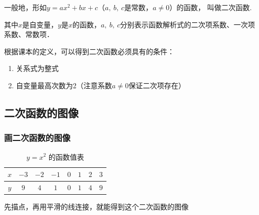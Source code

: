 \documentclass[lang=cn, 10pt, titlestyle=display, oneside, toc=twocol]{elegantbook}
\begin{document}
\begin{definition}
一般地，形如\(y=ax^2+bx+c\)（\(a,\ b,\ c\)是常数，\(a\ne0\)）的函数， 叫做二次函数.
\par
其中\(x\)是自变量，\(y\)是\(x\)的函数，\(a,\ b,\ c\)分别表示函数解析式的二次项系数、一次项系数、常数项．
\end{definition}

根据课本的定义，可以得到二次函数必须具有的条件：
\begin{enumerate}
    \item 关系式为整式
    \item 自变量最高次数为2（注意系数\(a\ne0\)保证二次项存在）
\end{enumerate}

\subsection{二次函数的图像}

\subsubsection{画二次函数的图像}
\begin{table}[h]
\centering
\renewcommand{\arraystretch}{1.2} %
\begin{tabular}{|c|*{7}{c|}} \hline
\( x \) & \(-3\) & \(-2\) & \(-1\) & \(0\) & \(1\) & \(2\) & \(3\) \\ \hline\hline
\( y \) & \(9\) & \(4\) & \(1\) & \(0\) & \(1\) & \(4\) & \(9\) \\ \hline
\end{tabular}
\caption{\( y = x^2 \) 的函数值表}
\end{table}

先描点，再用平滑的线连接，就能得到这个二次函数的图像

\begin{figure}[h]
    \centering
    \caption{}
    \label{fuc_1}
\end{figure}
\end{document}
